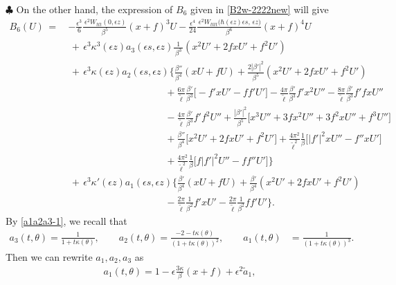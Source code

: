 \documentclass[10pt, reqno]{amsart}
\numberwithin{equation}{section}
\theoremstyle{definition}
\begin{document}
{{\smallskip
\noindent$\clubsuit$
On the other hand, the expression of $B_6$ given in \eqref{B2w-2222new} will give
\begin{align*}
B_6(U)
\,=\,& - \frac{\epsilon^3}{6} \frac{\, \epsilon^2 W_{ttt}(0, \epsilon z)}{\beta^5} (x+f)^3 U
 -\frac{\epsilon^4}{24} \frac{\,\epsilon^2 W_{tttt}\big(\hbar(\epsilon z)\epsilon s, \, \epsilon z\big)}{\beta^6} (x+f)^4U
\nonumber\\[2mm]
&
\,+\,\epsilon^3 \kappa^3(\epsilon z) a_3(\epsilon s, \epsilon z)
\frac{1}{\, \beta^3\, }(x^2U'+2fxU'+f^2U')
\nonumber\\[2mm]
&\,+\,
\epsilon^3 \kappa(\epsilon z) a_2(\epsilon s, \epsilon z)
\Bigg\{
\frac{\beta''} {\beta^4} (xU+fU)
+\frac{2|\beta'|^2}{\beta^5} (x^2U'+2fxU'+f^2U')
\nonumber\\[2mm]
&\qquad\qquad\qquad\qquad\qquad
+\frac{6\pi}{{\tilde\ell}}\frac{\beta'} {\beta^3} \big[- f' xU' - ff' U' \big]
- \frac{4\pi}{{\tilde\ell}} \frac{\beta'} {\beta^3} f' x^2U''
-\frac{ 8\pi}{ {\tilde\ell}}\frac{\beta'} {\beta^3} f' fxU''
\nonumber\\[2mm]
&\qquad\qquad\qquad\qquad\qquad
-\frac{4\pi}{{\tilde\ell}} \frac{\beta'} {\beta^3} f' f^2U''
+ \frac{|\beta'|^2}{\beta^5} \big[x^3U''+3fx^2U''+3f^2xU''+f^3U''\big]
\nonumber\\[2mm]
&\qquad\qquad\qquad\qquad\qquad
+ \frac{\beta''}{\beta^4} \big[x^2U'+2fxU'+f^2U'\big]
+\frac{4\pi^2}{{\tilde\ell}^2}\frac{1}{\beta} \big[ |f'|^2 xU'' -f''xU'\big]
\nonumber\\[2mm]
&\qquad\qquad\qquad\qquad\qquad
+\frac{4\pi^2}{{\tilde\ell}^2}\frac{1}{\beta} \big[ f|f'|^2 U'' -ff''U' \big]
\Bigg\}
\nonumber\\[2mm]
&\,+\,
\epsilon^3 \kappa'(\epsilon z)a_1(\epsilon s, \epsilon z)
\Bigg\{
\frac{\beta'}{\beta^4} (xU+fU)
+\frac{\beta'}{\beta^4} (x^2U'+2fxU'+f^2U')
\nonumber\\[2mm]
&\qquad\qquad\qquad\qquad\qquad
-\frac{2\pi}{{\tilde\ell}}\frac{1}{ \beta^2}f' xU'
-\frac{2\pi}{{\tilde\ell}}\frac{1}{ \beta^2} ff' U'
\Bigg\}.
\end{align*}
By \eqref{a1a2a3-1}, we recall that
\begin{align*}
a_3(t, \theta)=\frac{1}{1+t \kappa (\theta) },
\qquad
a_2(t, \theta)=\frac{-2-t \kappa (\theta)}{(1+t \kappa (\theta) )^2 },
\qquad
a_1(t, \theta)&=\frac{1}{(1+t \kappa (\theta) )^3 }.
\end{align*}
Then we can rewrite $a_1, a_2, a_3$ as
\begin{align}\label{a1a2a3}
a_1(t, \theta) = 1- \epsilon \frac{3\kappa}{\beta}(x+f) + \epsilon^2 {\tilde a}_1,

\end{align}}}
\end{document}
